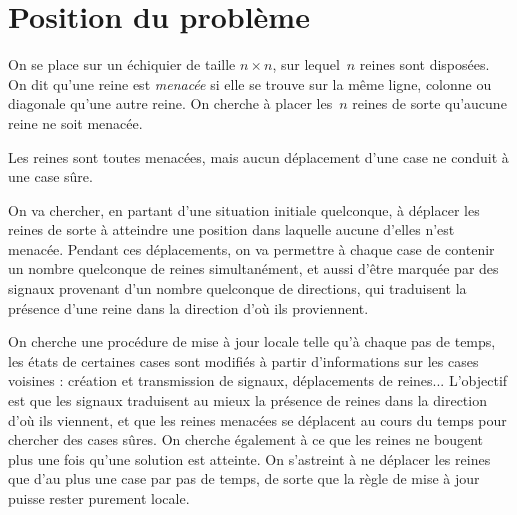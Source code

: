 \section{Position du problème}
\label{sec:intronreines}



On se place sur un échiquier de  taille $n \times n$, sur lequel~$n$ reines sont
disposées. On dit qu'une reine est  \emph{menacée} si elle se trouve sur la même
ligne,  colonne ou diagonale  qu'une autre  reine. On  cherche à  placer les~$n$
reines de sorte qu'aucune reine ne soit menacée.
\begin{floatingfigure}[r]{.5\textwidth}
\centering
\newgame
{}
\notationoff
\showboard
\caption{Les reines sont toutes menacées, mais aucun déplacement d'une case ne conduit à une case sûre.}
\label{fig:blocage}
\end{floatingfigure} 
On va chercher,  en partant d'une situation initiale  quelconque, à déplacer les
reines  de sorte à  atteindre une  position dans  laquelle aucune  d'elles n'est
menacée. Pendant ces \linebreak déplace\-ments, on va  permettre à chaque case de contenir un
nombre  quel\-conque de  reines simultanément,  et  aussi d'être  marquée par  des
signaux  provenant  d'un nombre  quelconque  de  directions,  qui traduisent  la
présence d'une reine dans la direction d'où ils proviennent. %



On cherche une procédure de mise à jour locale telle qu'à chaque pas
de temps, les états de certaines cases sont modifiés à partir d'informations sur
les  cases voisines  :  création  et transmission  de  signaux, déplace\-ments  de
reines... L'objectif est que  les signaux  tradui\-sent au  mieux la  présence de reines  dans la  direction d'où  ils vien\-nent,  et que  les reines
menacées  se déplacent  au cours  du  temps pour  chercher des  cases sûres.  On
cherche également à  ce que les reines ne bougent plus  une fois qu'une solution
est atteinte. On s'astreint à ne déplacer les reines  que d'au plus une case par pas de temps,
de sorte que la règle de mise  à jour puisse rester purement locale.

